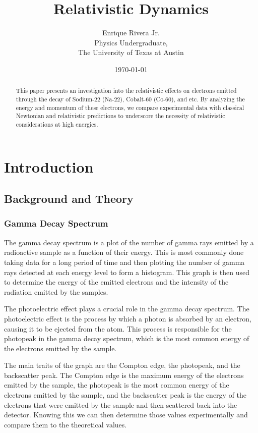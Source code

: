 \documentclass[12pt]{article}
\title{Relativistic Dynamics}
\author{Enrique Rivera Jr. \\
        Physics Undergraduate, \\ 
        The University of Texas at Austin}
\date{\today}
\begin{document}
\maketitle

\begin{abstract}
        This paper presents an investigation into the relativistic effects on electrons emitted through 
        the decay of Sodium-22 (Na-22), Cobalt-60 (Co-60), and etc. By analyzing the energy and momentum of these electrons, 
        we compare experimental data with classical Newtonian and relativistic predictions to underscore 
        the necessity of relativistic considerations at high energies.
\end{abstract}

\section{Introduction}
    \subsection{Background and Theory}

        \subsubsection{Gamma Decay Spectrum} 
        The gamma decay spectrum is a plot of the number of gamma rays emitted by a radioactive sample as a function of their energy.
        This is most commonly done taking data for a long period of time and then plotting the number of gamma rays detected at each energy level to form a histogram.
        This graph is then used to determine the energy of the emitted electrons and the intensity of the radiation emitted by the samples.

        The photoelectric effect plays a crucial role in the gamma decay spectrum. The photoelectric effect is the process by 
        which a photon is absorbed by an electron, causing it to be ejected from the atom. This process is responsible for the
        photopeak in the gamma decay spectrum, which is the most common energy of the electrons emitted by the sample.
        
        The main traits of the graph are the Compton edge, the photopeak, and the backscatter peak. 
        The Compton edge is the maximum energy of the electrons emitted by the sample, the photopeak is the most common 
        energy of the electrons emitted by the sample, and the backscatter peak is the energy of the electrons that were emitted 
        by the sample and then scattered back into the detector. Knowing this we can then determine those values experimentally 
        and compare them to the theoretical values.
        \\ \\
        
\end{document}
